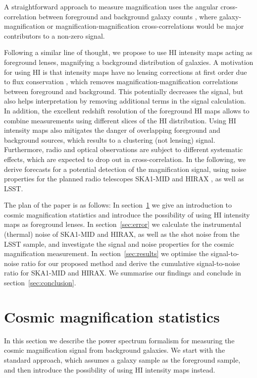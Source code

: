 \documentclass[useAMS,usenatbib]{mnras}
\begin{document}
A straightforward approach to measure magnification uses the angular cross-correlation between foreground and background galaxy counts \citep[see e.g.][]{2009A&A...507..683H}, where galaxy-magnification or magnification-magnification cross-correlations would be major contributors to a non-zero signal.

Following a similar line of thought, we propose to use HI intensity maps acting as foreground lenses, magnifying a background distribution of galaxies. A motivation for using HI is that intensity maps have no lensing corrections at first order due to flux conservation \citep{PhysRevD.87.064026}, which removes magnification-magnification correlations between foreground and background. This potentially decreases the signal, but also helps interpretation by removing additional terms in the signal calculation. In addition, the excellent redshift resolution of the foreground HI maps allows to combine measurements using different slices of the HI distribution. Using HI intensity maps also mitigates the danger of overlapping foreground and background sources, which results to a clustering (not lensing) signal. Furthermore, radio and optical observations are subject to different systematic effects, which are expected to drop out in cross-correlation. In the following, we derive forecasts for a potential detection of the magnification signal, using noise properties for the planned radio telescopes SKA1-MID \citep{Bacon:2018dui} and HIRAX \citep{2016SPIE.9906E..5XN}, as well as LSST.

The plan of the paper is as follows: In section~\ref{sec:maggal} we give an introduction to cosmic magnification statistics and introduce the possibility of using HI intensity maps as foreground lenses. In section~\ref{sec:error} we calculate the instrumental (thermal) noise of SKA1-MID and HIRAX, as well as the shot noise from the LSST sample, and investigate the signal and noise properties for the cosmic magnification measurement. In section~\ref{sec:results} we optimise the signal-to-noise ratio for our proposed method and derive the cumulative signal-to-noise ratio for SKA1-MID and HIRAX. We summarise our findings and conclude in section~\ref{sec:conclusion}.




\section{Cosmic magnification statistics}
\label{sec:maggal}

In this section we describe the power spectrum formalism for measuring the cosmic magnification signal from background galaxies. We start with the standard approach, which assumes a galaxy sample as the foreground sample, and then introduce the possibility of using HI intensity maps instead.
\end{document}
